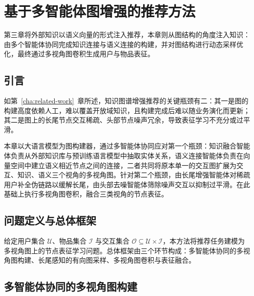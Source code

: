 
\chapter{基于多智能体图增强的推荐方法}
\label{cha:multi-agent-graph}

第三章将外部知识以语义向量的形式注入推荐，本章则从图结构的角度注入知识：由多个智能体协同完成知识连接与语义连接的构建，并对图结构进行动态采样优化，最终通过多视角图卷积生成用户与物品表征。


\section{引言}
\label{sec:graph-intro}

如第~\ref{cha:related-work}~章所述，知识图谱增强推荐的关键瓶颈有二：其一是图的构建高度依赖人工，难以覆盖开放域知识，且构建完成后难以随业务演化而更新；其二是图上的长尾节点交互稀疏、头部节点噪声冗余，导致表征学习不充分或过平滑。

本章以大语言模型为图构建器，通过多智能体协同应对第一个瓶颈：知识融合智能体负责从外部知识库与预训练语言模型中抽取实体关系，语义连接智能体负责在向量空间中建立语义相近节点之间的连接，二者共同将原本单一的交互图扩展为交互、知识、语义三个视角的多视角图。针对第二个瓶颈，由长尾增强智能体对稀疏用户补全伪链路以缓解长尾，由头部去噪智能体筛除噪声交互以抑制过平滑。在此基础上执行多视角图卷积，融合三类视角的节点表征。

\section{问题定义与总体框架}
\label{sec:graph-problem}

给定用户集合 $\mathcal{U}$、物品集合 $\mathcal{I}$ 与交互集合 $\mathcal{O}\subseteq\mathcal{U}\times\mathcal{I}$，本方法将推荐任务建模为多视角图上的节点表征学习问题。总体框架由三个环节构成：多智能体协同的多视角图构建、长尾感知的有向图采样、多视角图卷积与表征融合。


\section{多智能体协同的多视角图构建}
\label{sec:multi-view-graph}

